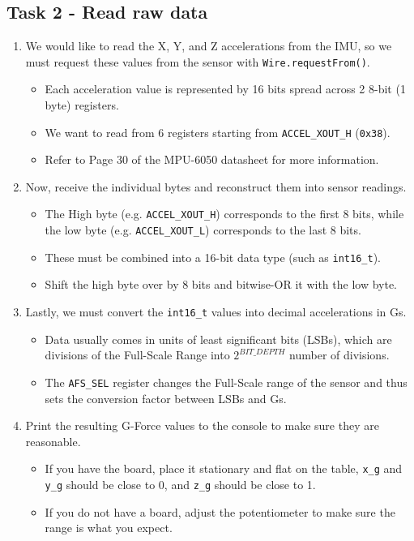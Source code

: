 \documentclass{article}
\begin{document}
    \subsection{Task 2 - Read raw data}\label{Sec2}
        \begin{enumerate}
            \item We would like to read the X, Y, and Z accelerations from the IMU, so we must request these values from the sensor with \texttt{Wire.requestFrom()}.
            \begin{itemize}
                \item Each acceleration value is represented by 16 bits spread across 2 8-bit (1 byte) registers.
                \item We want to read from 6 registers starting from \texttt{ACCEL\_XOUT\_H} (\texttt{0x38}).
                \item Refer to Page 30 of the MPU-6050 datasheet for more information.
            \end{itemize}
            \item Now, receive the individual bytes and reconstruct them into sensor readings.
            \begin{itemize}
                \item The High byte (e.g. \texttt{ACCEL\_XOUT\_H}) corresponds to the first 8 bits, while the low byte (e.g. \texttt{ACCEL\_XOUT\_L}) corresponds to the last 8 bits.
                \item These must be combined into a 16-bit data type (such as \texttt{int16\_t}).
                \item Shift the high byte over by 8 bits and bitwise-OR it with the low byte.
            \end{itemize}
            \item Lastly, we must convert the \texttt{int16\_t} values into decimal accelerations in Gs.
            \begin{itemize}
                \item Data usually comes in units of least significant bits (LSBs), which are divisions of the Full-Scale Range into $2^{BIT\_DEPTH}$ number of divisions.
                \item The \texttt{AFS\_SEL} register changes the Full-Scale range of the sensor and thus sets the conversion factor between LSBs and Gs.
            \end{itemize}
            \item Print the resulting G-Force values to the console to make sure they are reasonable.
            \begin{itemize}
                \item If you have the board, place it stationary and flat on the table, \texttt{x\_g} and \texttt{y\_g} should be close to 0, and \texttt{z\_g} should be close to 1.
                \item If you do not have a board, adjust the potentiometer to make sure the range is what you expect.
            \end{itemize}
        \end{enumerate}
        
\end{document}
